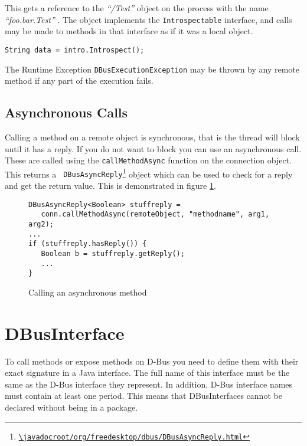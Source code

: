 \documentclass[a4paper,12pt]{article}
\begin{document}
This gets a reference to the {\em ``/Test''} object on the process with the
name {\em ``foo.bar.Test''} . The object implements the {\tt Introspectable}
interface, and calls may be made to methods in that interface as if it was a
local object.

\begin{verbatim}
String data = intro.Introspect();
\end{verbatim}

The Runtime Exception {\tt DBusExecutionException} may be thrown
by any remote method if any part of the execution fails.

\subsection{Asynchronous Calls}

Calling a method on a remote object is synchronous, that is the thread will
block until it has a reply. If you do not want to block you can use an
asynchronous call. These are called using the {\tt callMethodAsync} function on
the connection object. This returns a {\tt
DBusAsyncReply\footnote{\url{\javadocroot/org/freedesktop/dbus/DBusAsyncReply.html}}}
object which can be used to check for a reply and get the return value. This is demonstrated in figure \ref{fig:async}.

\begin{figure}[htb]
\begin{center}
\begin{verbatim}
DBusAsyncReply<Boolean> stuffreply = 
   conn.callMethodAsync(remoteObject, "methodname", arg1, arg2);
...
if (stuffreply.hasReply()) {
   Boolean b = stuffreply.getReply();
   ...
}
\end{verbatim}
\end{center}
\caption{Calling an asynchronous method}
\label{fig:async}
\end{figure}


\section{DBusInterface}

To call methods or expose methods on D-Bus you need to define them with their
exact signature in a Java interface. The full name of this interface must be
the same as the D-Bus interface they represent. In addition, D-Bus interface
names must contain at least one period. This means that DBusInterfaces cannot
be declared without being in a package. 
\end{document}
